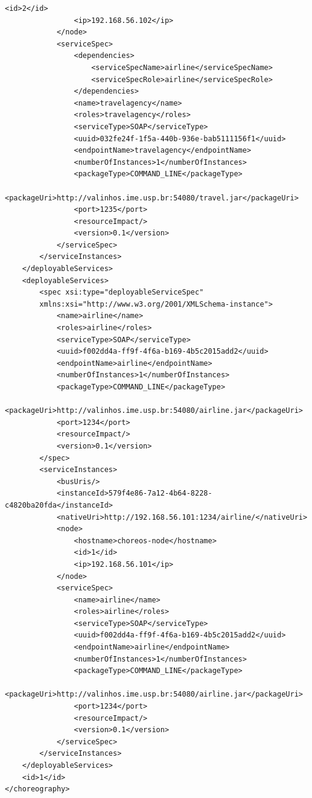 \documentclass[a4paper, 10pt]{article}
\begin{document}
{\begin{lstlisting}[caption=Choreography XML representation example, label=lst:chor_xml]
                <id>2</id>
                <ip>192.168.56.102</ip>
            </node>
            <serviceSpec>
                <dependencies>
                    <serviceSpecName>airline</serviceSpecName>
                    <serviceSpecRole>airline</serviceSpecRole>
                </dependencies>
                <name>travelagency</name>
                <roles>travelagency</roles>
                <serviceType>SOAP</serviceType>
                <uuid>032fe24f-1f5a-440b-936e-bab5111156f1</uuid>
                <endpointName>travelagency</endpointName>
                <numberOfInstances>1</numberOfInstances>
                <packageType>COMMAND_LINE</packageType>
                <packageUri>http://valinhos.ime.usp.br:54080/travel.jar</packageUri>
                <port>1235</port>
                <resourceImpact/>
                <version>0.1</version>
            </serviceSpec>
        </serviceInstances>
    </deployableServices>
    <deployableServices>
        <spec xsi:type="deployableServiceSpec" 
        xmlns:xsi="http://www.w3.org/2001/XMLSchema-instance">
            <name>airline</name>
            <roles>airline</roles>
            <serviceType>SOAP</serviceType>
            <uuid>f002dd4a-ff9f-4f6a-b169-4b5c2015add2</uuid>
            <endpointName>airline</endpointName>
            <numberOfInstances>1</numberOfInstances>
            <packageType>COMMAND_LINE</packageType>
            <packageUri>http://valinhos.ime.usp.br:54080/airline.jar</packageUri>
            <port>1234</port>
            <resourceImpact/>
            <version>0.1</version>
        </spec>
        <serviceInstances>
            <busUris/>
            <instanceId>579f4e86-7a12-4b64-8228-c4820ba20fda</instanceId>
            <nativeUri>http://192.168.56.101:1234/airline/</nativeUri>
            <node>
                <hostname>choreos-node</hostname>
                <id>1</id>
                <ip>192.168.56.101</ip>
            </node>
            <serviceSpec>
                <name>airline</name>
                <roles>airline</roles>
                <serviceType>SOAP</serviceType>
                <uuid>f002dd4a-ff9f-4f6a-b169-4b5c2015add2</uuid>
                <endpointName>airline</endpointName>
                <numberOfInstances>1</numberOfInstances>
                <packageType>COMMAND_LINE</packageType>
                <packageUri>http://valinhos.ime.usp.br:54080/airline.jar</packageUri>
                <port>1234</port>
                <resourceImpact/>
                <version>0.1</version>
            </serviceSpec>
        </serviceInstances>
    </deployableServices>
    <id>1</id>
</choreography>
\end{lstlisting}

}
\end{document}
